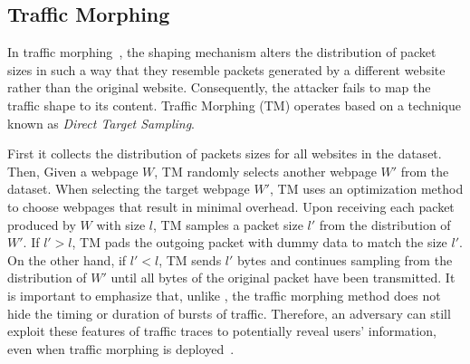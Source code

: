 \subsection{Traffic Morphing}\label{subsubsec:traffic-morphing}
In traffic morphing~\cite{wright2009traffic}, the shaping mechanism alters the distribution of packet sizes in such a way that they resemble packets generated by a different website rather than the original website.
Consequently, the attacker fails to map the traffic shape to its content. 
Traffic Morphing (TM) operates based on a technique known as \textit{Direct Target Sampling}.

First it collects the distribution of packets sizes for all websites in the dataset.
Then, Given a webpage $W$, TM randomly selects another webpage $W'$ from the dataset.
When selecting the target webpage $W'$, TM uses an optimization method to choose webpages that result in minimal overhead. 
Upon receiving each packet produced by $W$ with size $l$, TM samples a packet size $l'$ from the distribution of $W'$. 
If $l' > l$, TM pads the outgoing packet with dummy data to match the size $l'$. 
On the other hand, if $l' < l$, TM sends $l'$ bytes and continues sampling from the distribution of $W'$ until all bytes of the original packet have been transmitted.
It is important to emphasize that, unlike {\sys}, the traffic morphing method does not hide the timing or duration of bursts of traffic.
Therefore, an adversary can still exploit these features of traffic traces to potentially reveal users' information, even when traffic morphing is deployed~\cite{dyer2012peek}.


